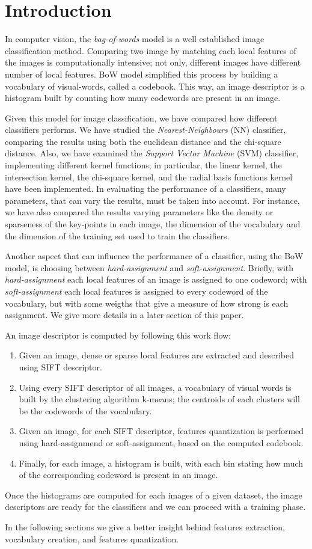 \section{Introduction}

In computer vision, the \emph{bag-of-words} model is a well established image classification method. Comparing two image by matching each local features of the images is computationally intensive; not only, different images have different number of local features. BoW model simplified this process by building a vocabulary of visual-words, called a codebook. This way, an image descriptor is a histogram built by counting how many codewords are present in an image.

Given this model for image classification, we have compared how different classifiers performs.
We have studied the \emph{Nearest-Neighbours} (NN) classifier, comparing the results using both the euclidean distance and the chi-square distance.
Also, we have examined the \emph{Support Vector Machine} (SVM) classifier, implementing different kernel functions; in particular, the linear kernel, the intersection kernel, the chi-square kernel, and the radial basis functions kernel have been implemented.
In evaluating the performance of a classifiers, many parameters, that can vary the results, must be taken into account.
For instance, we have also compared the results varying parameters like the density or sparseness of the key-points in each image, the dimension of the vocabulary and the dimension of the training set used to train the classifiers.

Another aspect that can influence the performance of a classifier, using the BoW model, is choosing between \emph{hard-assignment} and \emph{soft-assignment}. Briefly, with \emph{hard-assignment} each local features of an image is assigned to one codeword; with \emph{soft-assignment} each local features is assigned to every codeword of the vocabulary, but with some weigths that give a measure of how strong is each assignment. We give more details in a later section of this paper.

An image descriptor is computed by following this work flow:
\begin{enumerate}
\item Given an image, dense or sparse local features are extracted and described using SIFT descriptor.
\item Using every SIFT descriptor of all images, a vocabulary of visual words is built by the clustering algorithm k-means; the centroids of each clusters will be the codewords of the vocabulary.
\item Given an image, for each SIFT descriptor, features quantization is performed using hard-assignmend or soft-assignment, based on the computed codebook.
\item Finally, for each image, a histogram is built, with each bin stating how much of the corresponding codeword is present in an image.
\end{enumerate}

Once the histograms are computed for each images of a given dataset, the image descriptors are ready for the classifiers and we can proceed with a training phase.

In the following sections we give a better insight behind features extraction, vocabulary creation, and features quantization.





